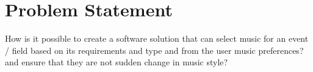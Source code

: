 \chapter{Problem Statement}

How is it possible to create a software solution that can select music for an event / field based on its requirements and type and from the user music preferences? and ensure that they are not sudden change in music style?